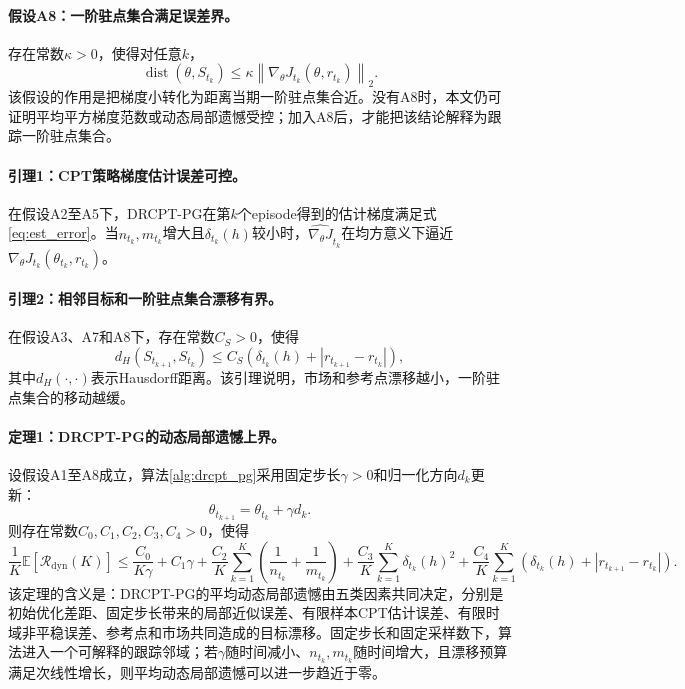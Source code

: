 \documentclass{sufethesismas}
\begin{document}
\paragraph{假设A8：一阶驻点集合满足误差界。}
存在常数$\kappa>0$，使得对任意$k$，
\begin{equation}
\label{eq:error_bound}
\operatorname{dist}(\theta,S_{t_k})
\le
\kappa
\left\|
\nabla_\theta J_{t_k}(\theta,r_{t_k})
\right\|_2.
\end{equation}
该假设的作用是把梯度小转化为距离当期一阶驻点集合近。没有A8时，本文仍可证明平均平方梯度范数或动态局部遗憾受控；加入A8后，才能把该结论解释为跟踪一阶驻点集合。

\paragraph{引理1：CPT策略梯度估计误差可控。}
在假设A2至A5下，DRCPT-PG在第$k$个episode得到的估计梯度满足式\eqref{eq:est_error}。当$n_{t_k},m_{t_k}$增大且$\delta_{t_k}(h)$较小时，$\widehat{\nabla_\theta J}_{t_k}$在均方意义下逼近$\nabla_\theta J_{t_k}(\theta_{t_k},r_{t_k})$。

\paragraph{引理2：相邻目标和一阶驻点集合漂移有界。}
在假设A3、A7和A8下，存在常数$C_S>0$，使得
\begin{equation}
\label{eq:set_drift}
d_H(S_{t_{k+1}},S_{t_k})
\le
C_S
\left(
\delta_{t_k}(h)+|r_{t_{k+1}}-r_{t_k}|
\right),
\end{equation}
其中$d_H(\cdot,\cdot)$表示Hausdorff距离。该引理说明，市场和参考点漂移越小，一阶驻点集合的移动越缓。

\paragraph{定理1：DRCPT-PG的动态局部遗憾上界。}
设假设A1至A8成立，算法\ref{alg:drcpt_pg}采用固定步长$\gamma>0$和归一化方向$d_k$更新：
\begin{equation}
\label{eq:theta_update_theory}
\theta_{t_{k+1}}
=
\theta_{t_k}
+
\gamma d_k.
\end{equation}
则存在常数$C_0,C_1,C_2,C_3,C_4>0$，使得
\begin{equation}
\label{eq:main_bound}
\frac{1}{K}
\mathbb{E}
\left[
\mathcal{R}_{\mathrm{dyn}}(K)
\right]
\le
\frac{C_0}{K\gamma}
+
C_1\gamma
+
\frac{C_2}{K}
\sum_{k=1}^{K}
\left(
\frac{1}{n_{t_k}}
+
\frac{1}{m_{t_k}}
\right)
+
\frac{C_3}{K}
\sum_{k=1}^{K}
\delta_{t_k}(h)^2
+
\frac{C_4}{K}
\sum_{k=1}^{K}
\left(
\delta_{t_k}(h)+|r_{t_{k+1}}-r_{t_k}|
\right).
\end{equation}
该定理的含义是：DRCPT-PG的平均动态局部遗憾由五类因素共同决定，分别是初始优化差距、固定步长带来的局部近似误差、有限样本CPT估计误差、有限时域非平稳误差、参考点和市场共同造成的目标漂移。固定步长和固定采样数下，算法进入一个可解释的跟踪邻域；若$\gamma$随时间减小、$n_{t_k},m_{t_k}$随时间增大，且漂移预算满足次线性增长，则平均动态局部遗憾可以进一步趋近于零。
\end{document}
